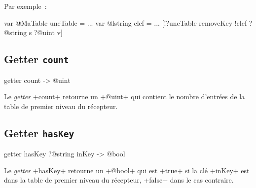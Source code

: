 Par exemple~:
\begin{galgas}
var @MaTable uneTable = {}
...
var @lstring clef = ...
[!?uneTable removeKey !clef ?@string s ?@uint v]
\end{galgas}


%
%

\subsection{Getter \texttt{count}}

\begin{galgas}
getter count -> @uint
\end{galgas}


Le \emph{getter} \ggs+count+ retourne un \ggs+@uint+ qui contient le nombre d'entrées de la table de premier niveau du récepteur.



\subsection{Getter \texttt{hasKey}}

\begin{galgas}
getter hasKey ?@string inKey -> @bool
\end{galgas}


Le \emph{getter} \ggs+hasKey+ retourne un \ggs+@bool+ qui est \ggs+true+ si la clé \ggs+inKey+ est dans la table de premier niveau du récepteur, \ggs+false+ dans le cas contraire.



